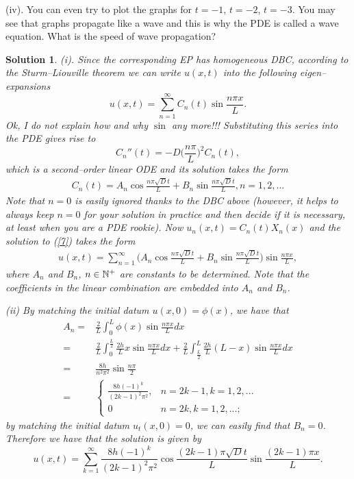 \documentclass[6pt]{article}
\newtheorem{solution}{Solution}
\numberwithin{equation}{section}
\def\mathbb{\Bbb}
\begin{document}
\begin{enumerate}
(iv).  You can even try to plot the graphs for $t=-1$, $t=-2$, $t=-3$.  You may see that graphs propagate like a wave and this is why the PDE is called a wave equation.  What is the speed of wave propagation?
\begin{solution}
(i).  Since the corresponding EP has homogeneous DBC, according to the Sturm--Liouville theorem we can write $u(x,t)$ into the following eigen--expansions
\[u(x,t)=\sum_{n=1}^\infty C_n(t)\sin \frac{n\pi x}{L}.\]
Ok, I do not explain how and why $\sin$ any more!!! Substituting this series into the PDE gives rise to
\[C_n''(t)=-D\Big(\frac{n\pi}{L}\Big)^2C_n(t),\]
which is a second--order linear ODE and its solution takes the form
\begin{align*}
C_n(t)=A_n\cos{\frac{n\pi \sqrt{D} t}{L}}+B_n\sin{\frac{n\pi \sqrt{D} t}{L}}, n=1,2,...
\end{align*}
Note that $n=0$ is easily ignored thanks to the DBC above (however, it helps to always keep $n=0$ for your solution in practice and then decide if it is necessary, at least when you are a PDE rookie).   Now $u_n(x,t)=C_n(t) X_n(x)$ and the solution to (\ref{7}) takes the form
\begin{align*}
u(x,t)=\sum_{n=1}^{\infty} \Big(A_n\cos{\frac{n\pi \sqrt{D} t}{L}}+B_n\sin{\frac{n\pi \sqrt{D} t}{L}}\Big)\sin{\frac{n\pi x}{L}},
\end{align*}
where $A_n$ and $B_n$, $n\in\mathbb N^+$ are constants to be determined.   Note that the coefficients in the linear combination are embedded into $A_n$ and $B_n$.

(ii)  By matching the initial datum $u(x,0)=\phi(x)$, we have that
\begin{align*}
A_n=&\frac{2}{L}\int_{0}^{L} \phi(x)\sin{\frac{n\pi x}{L}}dx\\
=&\frac{2}{L}\int_{0}^{\frac{L}{2}}\frac{2h}{L}x\sin{\frac{n\pi x}{L}}dx+\frac{2}{L}\int^{L}_{\frac{L}{2}}\frac{2h}{L}(L-x)\sin{\frac{n\pi x}{L}}dx\\
=&\frac{8h}{n^2\pi^2}\sin{\frac{n\pi}{2}}\\
=&
\begin{cases}
\frac{8h(-1)^k}{(2k-1)^2\pi^2},&n=2k-1,k=1,2,...\\
0&n=2k,k=1,2,...;
\end{cases}
\end{align*}
by matching the initial datum $u_t(x,0)=0$, we can easily find that $B_n=0$.  Therefore we have that the solution is given by
\[u(x,t)=\sum_{k=1}^{\infty} \frac{8h(-1)^k}{(2k-1)^2\pi^2} \cos{\frac{(2k-1)\pi \sqrt{D} t}{L}}\sin{\frac{(2k-1)\pi x}{L}}.\]


\end{solution}
\end{enumerate}
\end{document}
